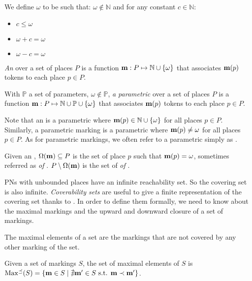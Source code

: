 \begin{defi}[\omark]
  We define $\omega$ to be such that:
  $\omega \notin \mathbb{N}$
  and for any constant $c \in \mathbb{N}$:
  \begin{itemize}
    \item $c \leq \omega$
    \item $\omega + c = \omega$
    \item $\omega - c = \omega$
  \end{itemize}

  \emph{An \omark} \mar over a set of places $P$ is a function $\mathbf{m} : P \mapsto \mathbb{N} \cup \{\omega\}$ that associates $\mathbf{m}(p)$ tokens to each place $p \in P$.

  With $\mathbb{P}$ a set of parameters, $\omega \notin \mathbb{P}$,
  \emph{a parametric \omark} \mar over a set of places $P$ is a function $\mathbf{m} : P \mapsto \mathbb{N} \cup \mathbb{P} \cup \{\omega\}$ that associates $\mathbf{m}(p)$ tokens to each place $p \in P$.
\end{defi}

Note that an \omark \mar is a parametric \omark where $\mathbf{m}(p) \in \mathbb{N} \cup \{\omega\}$ for all places $p \in P$.
Similarly, a parametric marking \mar is a parametric \omark where $\mathbf{m}(p) \neq \omega$ for all places $p \in P$.
As for parametric markings, we often refer to a parametric \omark simply as \omark.

Given an \omark \mar, $\Omega(\mathbf{m}) \subseteq P$ is the set of place $p$ such that $\mathbf{m}(p) = \omega$, sometimes referred as \emph{\oplaces of \mar}. $P \setminus \Omega(\mathbf{m})$ is the set of \emph{\noplaces of \mar}.

\acp{PN} with unbounded places have an infinite reachability set.
So the covering set is also infinite.
\emph{Coverability sets} are useful to give a finite representation of the covering set thanks to \omark.
In order to define them formally, we need to know about the maximal markings and the upward and downward closure of a set of markings.

The maximal elements of a set are the markings that are not covered by any other marking of the set.
\begin{defi}
  Given a set of markings $S$, the set of maximal elements of $S$ is
  $\operatorname{Max^\preceq}(S) = \{ \mathbf{m} \in S \mid \nexists \mathbf{m'} \in S \text{ s.t. } \mathbf{m} \prec \mathbf{m'} \}$.
\end{defi}

